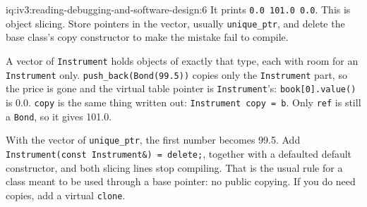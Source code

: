 \begin{solution}{iq:iv3:reading-debugging-and-software-design:6}
It prints \texttt{0.0 101.0 0.0}. This is object slicing. Store pointers in the vector, usually \texttt{unique\_ptr}, and delete the base class's copy constructor to make the mistake fail to compile.

A vector of \texttt{Instrument} holds objects of exactly that type, each with room for an \texttt{Instrument} only. \texttt{push\_back(Bond(99.5))} copies only the \texttt{Instrument} part, so the price is gone and the virtual table pointer is \texttt{Instrument}'s: \texttt{book[0].value()} is 0.0. \texttt{copy} is the same thing written out: \texttt{Instrument copy = b}. Only \texttt{ref} is still a \texttt{Bond}, so it gives 101.0.

With the vector of \texttt{unique\_ptr}, the first number becomes 99.5. Add \texttt{Instrument(const Instrument\&) = delete;}, together with a defaulted default constructor, and both slicing lines stop compiling. That is the usual rule for a class meant to be used through a base pointer: no public copying. If you do need copies, add a virtual \texttt{clone}.


\end{solution}

